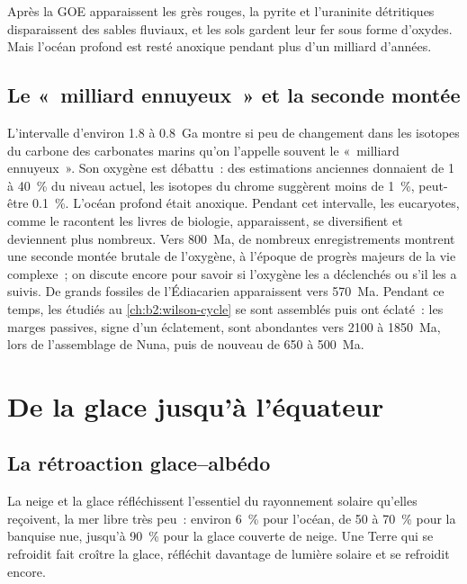 Après la GOE apparaissent les grès rouges, la pyrite et l'uraninite détritiques disparaissent des sables fluviaux,
et les sols gardent leur fer sous forme d'oxydes. Mais l'océan profond est resté anoxique pendant plus d'un milliard
d'années.

\subsection*{Le «~milliard ennuyeux~» et la seconde montée}

L'intervalle d'environ 1.8 à \qty{0.8}{Ga} montre si peu de changement dans les isotopes du carbone des
carbonates marins qu'on l'appelle souvent le «~milliard ennuyeux~». Son oxygène est débattu~: des estimations anciennes
donnaient de 1 à \qty{40}{\percent} du niveau actuel, les isotopes du chrome suggèrent moins de
\qty{1}{\percent}, peut-être \qty{0.1}{\percent}. L'océan profond était anoxique. Pendant cet intervalle,
les eucaryotes, comme le racontent les livres de biologie, apparaissent, se diversifient et deviennent plus nombreux. Vers \qty{800}{Ma},
de nombreux enregistrements montrent une seconde montée brutale de l'oxygène, à l'époque de progrès majeurs de la vie complexe~;
on discute encore pour savoir si l'oxygène les a déclenchés ou s'il les a suivis. De grands fossiles de l'Édiacarien
apparaissent vers \qty{570}{Ma}. Pendant ce temps, les  étudiés au \cref{ch:b2:wilson-cycle}
se sont assemblés puis ont éclaté~: les marges passives, signe d'un éclatement, sont abondantes vers 2100 à
\qty{1850}{Ma}, lors de l'assemblage de Nuna, puis de nouveau de 650 à \qty{500}{Ma}.

\section{De la glace jusqu'à l'équateur}\label{sec:b2:precambrian-earth:snowball}

\subsection*{La rétroaction glace--albédo}

La neige et la glace réfléchissent l'essentiel du rayonnement solaire qu'elles reçoivent, la mer libre très peu~: environ
\qty{6}{\percent} pour l'océan, de 50 à \qty{70}{\percent} pour la banquise nue, jusqu'à
\qty{90}{\percent} pour la glace couverte de neige. Une Terre qui se refroidit fait croître la glace, réfléchit davantage
de lumière solaire et se refroidit encore.

